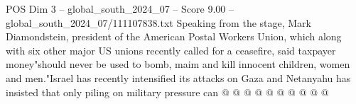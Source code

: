 \begin{textsample}{POS Dim 3 – global\_south\_2024\_07 – Score 9.00 – global\_south\_2024\_07/111107838.txt}
Speaking from the stage, Mark Diamondstein, president of the American Postal Workers Union, which along with six other major US unions recently called for a ceasefire, said taxpayer money"should never be used to bomb, maim and kill innocent children, women and men."Israel has recently intensified its attacks on Gaza and Netanyahu has insisted that only piling on military pressure can @ @ @ @ @ @ @ @ @ @

\end{textsample}
